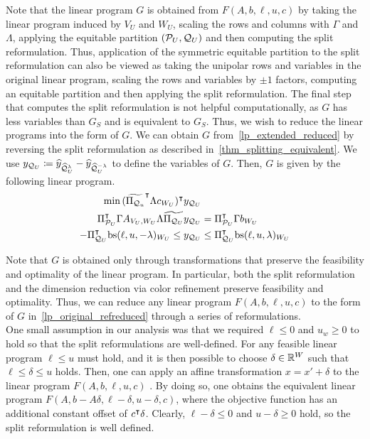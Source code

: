 \documentclass[pdflatex,sn-mathphys-num]{sn-jnl}%
\theoremstyle{thmstyleone}%
\theoremstyle{thmstylethree}%
\theoremstyle{thmstyletwo}%
\begin{document}
Note that the linear program $G$ is obtained from $F(A,b,\ell,u,c)$ by taking the linear program induced by $V_U$ and $W_U$, scaling the rows and columns with $\Gamma$ and $\Lambda$, applying the equitable partition $(\mathcal{P}_U,\mathcal{Q}_U)$ and then computing the split reformulation. Thus, application of the symmetric equitable partition to the split reformulation can also be viewed as taking the unipolar rows and variables in the original linear program, scaling the rows and variables by $\pm 1$ factors, computing an equitable partition and then applying the split reformulation. The final step that computes the split reformulation is not helpful computationally, as $G$ has less variables than $G_S$ and is equivalent to $G_S$. Thus, we wish to reduce the linear programs into the form of $G$. We can obtain $G$ from~\eqref{lp_extended_reduced} by reversing the split reformulation as described in~\cref{thm_splitting_equivalent}. We use $y_{\MQ_U} \coloneqq \widehat{y}_{\widehat{\MQ}^\lambda_U} - \widehat{y}_{\widehat{\MQ}^{-\lambda}_U}$ to define the variables of $G$. Then, $G$ is given by the following linear program.
\begin{subequations}
\label{lp_original_refreduced}
\begin{align}
    \min \, (\widetilde{\Pi_{\mathcal{Q}_u}}^{\intercal} \Lambda c_{W_U})^{\intercal} y_{\mathcal{Q}_U} & \\
    \Pi_{\mathcal{P}_U}^{\intercal} \Gamma A_{V_U,W_U} \Lambda \widetilde{\Pi_{\mathcal{Q}_U}} y_{\mathcal{Q}_U} &= \Pi_{\mathcal{P}_U}^{\intercal} \Gamma b_{W_U}\\
-\Pi_{\mathcal{Q}_U}^{\intercal}\mathrm{bs}(\ell,u,-\lambda)_{W_U} \leq y_{\mathcal{Q}_U} &\leq \Pi_{\mathcal{Q}_U}^{\intercal}\mathrm{bs}(\ell,u,\lambda)_{W_U} 
\end{align}    
\end{subequations}

Note that $G$ is obtained only through transformations that preserve the feasibility and optimality of the linear program. In particular, both the split reformulation and the dimension reduction via color refinement preserve feasibility and optimality.
Thus, we can reduce any linear program $F(A,b,\ell,u,c)$ to the form of $G$ in~\eqref{lp_original_refreduced} through a series of reformulations. \\

One small assumption in our analysis was that we required $\ell \leq 0$ and $u_w \geq 0$ to hold so that the split reformulations are well-defined. For any feasible linear program $\ell \leq u$ must hold, and it is then possible to choose $\delta \in \mathbb{R}^W$ such that $\ell \leq \delta \leq u$ holds. Then, one can apply an affine transformation $x = x' + \delta$ to the linear program $F(A,b,\ell,u,c)$ . By doing so, one obtains the equivalent linear program $F(A,b-A\delta, \ell - \delta, u - \delta,c)$, where the objective function has an additional constant offset of $c^{\intercal} \delta$. Clearly, $\ell - \delta \leq 0$ and $u-\delta \geq 0$ hold, so the split reformulation is well defined.
\end{document}
